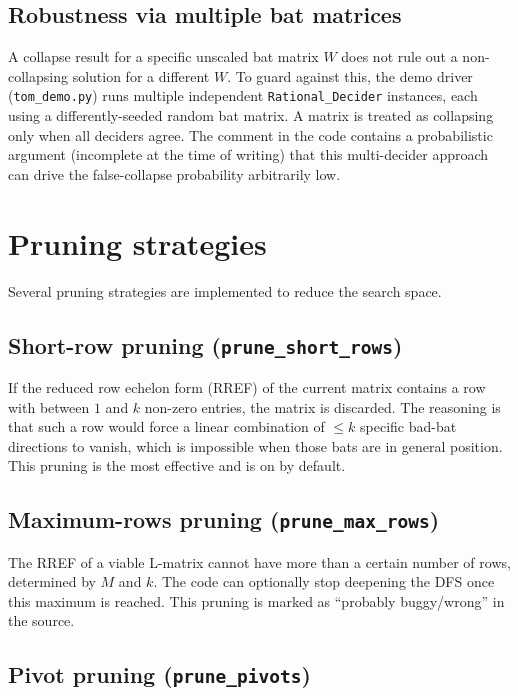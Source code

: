 \documentclass[12pt,a4paper]{article}
\begin{document}
\subsection*{Robustness via multiple bat matrices}

A collapse result for a specific unscaled bat matrix $W$ does not rule out a
non-collapsing solution for a different $W$. To guard against this, the demo
driver (\texttt{tom\_demo.py}) runs multiple independent \texttt{Rational\_Decider}
instances, each using a differently-seeded random bat matrix. A matrix is
treated as collapsing only when all deciders agree. The comment in the code
contains a probabilistic argument (incomplete at the time of writing) that this
multi-decider approach can drive the false-collapse probability arbitrarily
low.

\section{Pruning strategies}
\label{sec:pruning}

Several pruning strategies are implemented to reduce the search space.

\subsection{Short-row pruning (\texttt{prune\_short\_rows})}

If the reduced row echelon form (RREF) of the current matrix contains a row
with between $1$ and $k$ non-zero entries, the matrix is discarded. The
reasoning is that such a row would force a linear combination of $\leq k$
specific bad-bat directions to vanish, which is impossible when those bats are
in general position. This pruning is the most effective and is on by default.

\subsection{Maximum-rows pruning (\texttt{prune\_max\_rows})}

The RREF of a viable L-matrix cannot have more than a certain number of rows,
determined by $M$ and $k$. The code can optionally stop deepening the DFS once
this maximum is reached. This pruning is marked as ``probably buggy/wrong'' in
the source.

\subsection{Pivot pruning (\texttt{prune\_pivots})}
\end{document}
